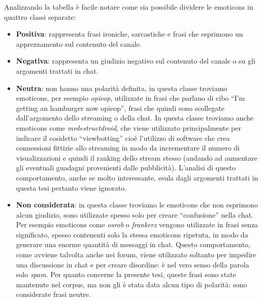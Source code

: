 \documentclass[a4paper,12pt,openright,twoside]{report}
\theoremstyle{definition}
\begin{document}
Analizzando la tabella è facile notare come sia possibile dividere le emoticons in quattro classi separate:
\begin{itemize}
\item \textbf{Positiva}: rappresenta frasi ironiche, sarcastiche e frasi che esprimono un apprezzamento sul contenuto del canale.
\item \textbf{Negativa}: rappresenta un giudizio negativo sul contenuto del canale o su gli argomenti trattati in chat.
\item \textbf{Neutra}: non hanno una polarità definita, in questa classe troviamo emoticons, per esempio \emph{opieop}, utilizzate in frasi che parlano di 
cibo ``I'm getting an hamburger now opieop'', frasi che quindi sono scollegate dall'argomento dello streaming o della chat. 
In questa classe troviamo anche emoticons come \emph{mrdestructdroid}, che viene utilizzato principalmente per indicare il cosidetto ``viewbotting'' 
cioè l'utilizzo di software che crea connessioni fittizie allo streaming in modo da incrementare il numero di visualizzazioni 
e quindi il ranking dello stream stesso (andando ad aumentare gli eventuali guadagni provenienti dalle pubblicità). 
L'analisi di questo comportamento, anche se molto interessante, esula dagli argomenti trattati in questa tesi pertanto viene ignorato.
\item \textbf{Non considerata}: in questa classe troviamo le emoticons che non esprimono alcun giudizio, sono utilizzate spesso solo per creare ``confusione'' nella chat.
Per esempio emoticons come \emph{osrob} o \emph{frankerz} vengono utilizzate in frasi senza significato, spesso contenenti solo la stessa emoticons ripetuta,
in modo da generare una enorme quantità di messaggi in chat. Questo comportamento, come avviene talvolta anche nei forum, viene utilizzato 
soltanto per impedire una discussione in chat e per creare disordine: è nel vero senso della parola solo \emph{spam}. 
Per quanto concerne la presente tesi,
queste frasi sono state mantenute nel corpus, ma non gli è stata data alcun tipo di polarità: sono considerate frasi neutre.
\end{itemize}
\end{document}
